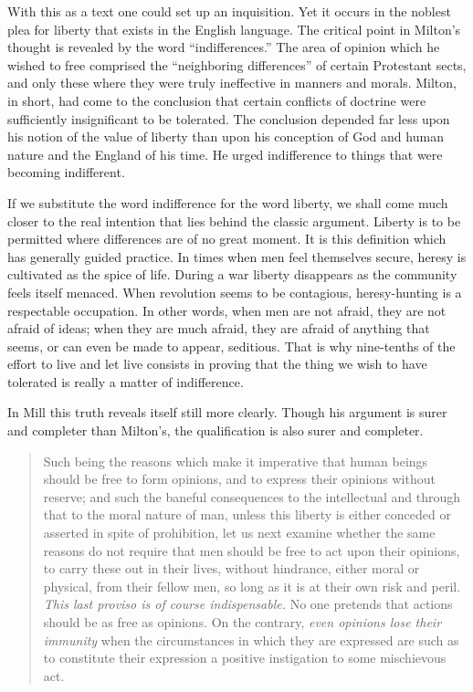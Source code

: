 \documentclass[openany,nobib,twoside,nohyper]{tufte-book}
\begin{document}
With this as a text one could set up an inquisition. Yet it occurs in
the noblest plea for liberty that exists in the English language. The
critical point in Milton's thought is revealed by the word
``indifferences.'' The area of opinion which he wished to free comprised
the ``neighboring differences'' of certain Protestant sects, and only
these where they were truly ineffective in manners and morals. Milton,
in short, had come to the conclusion that certain conflicts of doctrine
were sufficiently insignificant to be tolerated. The conclusion depended
far less upon his notion of the value of liberty than upon his
conception of God and human nature and the England of his time. He urged
indifference to things that were becoming indifferent.

If we substitute the word indifference for the word liberty, we shall
come much closer to the real intention that lies behind the classic
argument. Liberty is to be permitted where differences are of no great
moment. It is this definition which has generally guided practice. In
times when men feel themselves secure, heresy is cultivated as the spice
of life. During a war liberty disappears as the community feels itself
menaced. When revolution seems to be contagious, heresy-hunting is a
respectable occupation. In other words, when men are not afraid, they
are not afraid of ideas; when they are much afraid, they are afraid of
anything that seems, or can even be made to appear, seditious. That is
why nine-tenths of the effort to live and let live consists in proving
that the thing we wish to have tolerated is really a matter of
indifference.

In Mill this truth reveals itself still more clearly. Though his
argument is surer and completer than Milton's, the qualification is also
surer and completer.

\begin{quote}
Such being the reasons which make it imperative that human beings should
be free to form opinions, and to express their opinions without reserve;
and such the baneful consequences to the intellectual and through that
to the moral nature of man, unless this liberty is either conceded or
asserted in spite of prohibition, let us next examine whether the same
reasons do not require that men should be free to act upon their
opinions, to carry these out in their lives, without hindrance, either
moral or physical, from their fellow men, so long as it is at their own
risk and peril. \emph{This last proviso is of course indispensable.} No
one pretends that actions should be as free as opinions. On the
contrary, \emph{even opinions lose their immunity} when the
circumstances in which they are expressed are such as to constitute
their expression a positive instigation to some mischievous act.
\end{quote}
\end{document}
